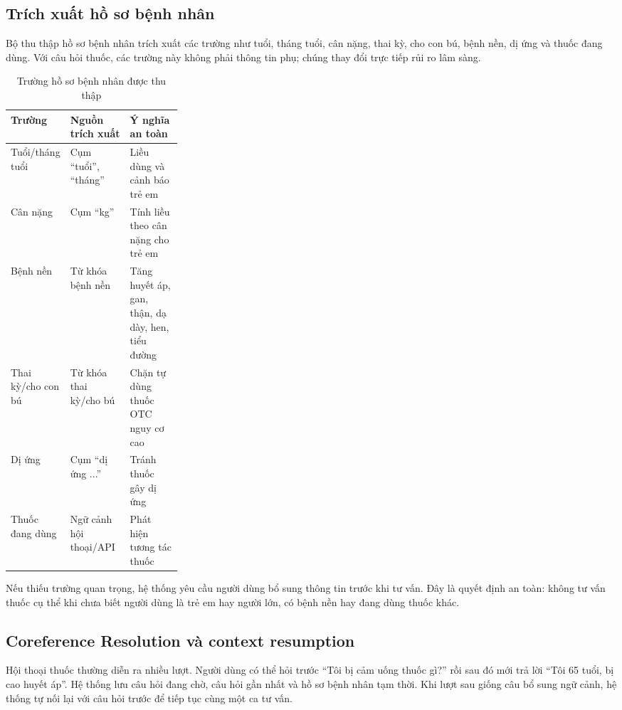 \subsection{Trích xuất hồ sơ bệnh nhân}

Bộ thu thập hồ sơ bệnh nhân trích xuất các trường như tuổi, tháng tuổi, cân nặng, thai kỳ, cho con bú, bệnh nền, dị ứng và thuốc đang dùng. Với câu hỏi thuốc, các trường này không phải thông tin phụ; chúng thay đổi trực tiếp rủi ro lâm sàng.

\begin{table}[H]
\centering
\small
\caption{Trường hồ sơ bệnh nhân được thu thập}
\begin{tabularx}{\linewidth}{p{0.28\linewidth} Y Y}
\toprule
\textbf{Trường} & \textbf{Nguồn trích xuất} & \textbf{Ý nghĩa an toàn} \\
\midrule
Tuổi/tháng tuổi & Cụm ``tuổi'', ``tháng'' & Liều dùng và cảnh báo trẻ em \\
Cân nặng & Cụm ``kg'' & Tính liều theo cân nặng cho trẻ em \\
Bệnh nền & Từ khóa bệnh nền & Tăng huyết áp, gan, thận, dạ dày, hen, tiểu đường \\
Thai kỳ/cho con bú & Từ khóa thai kỳ/cho bú & Chặn tự dùng thuốc OTC nguy cơ cao \\
Dị ứng & Cụm ``dị ứng ...'' & Tránh thuốc gây dị ứng \\
Thuốc đang dùng & Ngữ cảnh hội thoại/API & Phát hiện tương tác thuốc \\
\bottomrule
\end{tabularx}
\end{table}

Nếu thiếu trường quan trọng, hệ thống yêu cầu người dùng bổ sung thông tin trước khi tư vấn. Đây là quyết định an toàn: không tư vấn thuốc cụ thể khi chưa biết người dùng là trẻ em hay người lớn, có bệnh nền hay đang dùng thuốc khác.

\subsection{Coreference Resolution và context resumption}

Hội thoại thuốc thường diễn ra nhiều lượt. Người dùng có thể hỏi trước ``Tôi bị cảm uống thuốc gì?'' rồi sau đó mới trả lời ``Tôi 65 tuổi, bị cao huyết áp''. Hệ thống lưu câu hỏi đang chờ, câu hỏi gần nhất và hồ sơ bệnh nhân tạm thời. Khi lượt sau giống câu bổ sung ngữ cảnh, hệ thống tự nối lại với câu hỏi trước để tiếp tục cùng một ca tư vấn.

